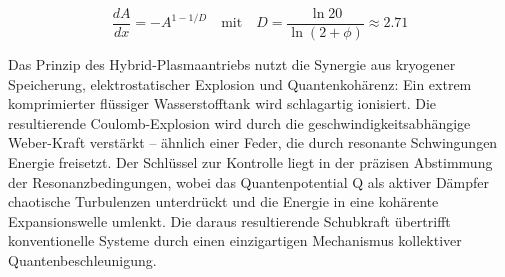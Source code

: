 \begin{equation}
\frac{dA}{dx} = -A^{1-1/D} \quad \text{mit} \quad D = \frac{\ln 20}{\ln(2+\phi)} \approx 2.71
\label{eq:duese}
\end{equation}

Das Prinzip des Hybrid-Plasmaantriebs nutzt die Synergie aus kryogener Speicherung, elektrostatischer Explosion und Quantenkohärenz: Ein extrem komprimierter flüssiger Wasserstofftank wird schlagartig
ionisiert. Die resultierende Coulomb-Explosion wird durch die geschwindigkeitsabhängige Weber-Kraft verstärkt – ähnlich einer Feder, die durch resonante Schwingungen Energie freisetzt. Der Schlüssel
zur Kontrolle liegt in der präzisen Abstimmung der Resonanzbedingungen, wobei das Quantenpotential Q als aktiver Dämpfer chaotische Turbulenzen unterdrückt und die Energie in eine kohärente
Expansionswelle umlenkt. Die daraus resultierende Schubkraft übertrifft konventionelle Systeme durch einen einzigartigen Mechanismus kollektiver Quantenbeschleunigung.
